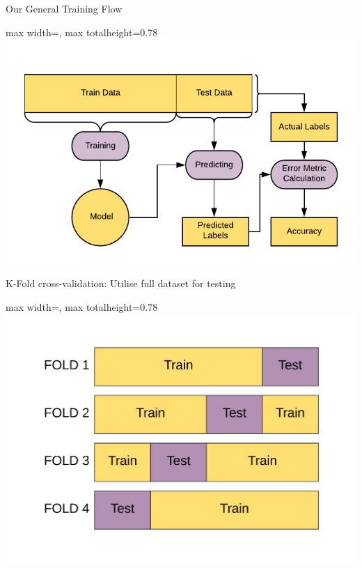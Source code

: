 \documentclass[aspectratio=169,10pt]{beamer}
\newcommand{\fitpic}[1]{\begin{adjustbox}{max width=\linewidth, max totalheight=0.78\textheight}#1\end{adjustbox}}
\begin{document}
	\begin{frame}{Our General Training Flow}
	\fitpic{\includegraphics[width = \textwidth]{../assets/bias-variance/diagrams/general-workflow}}
	\end{frame}

	\begin{frame}{K-Fold cross-validation: Utilise full dataset for testing}
	\fitpic{\includegraphics[width = \textwidth]{../assets/bias-variance/diagrams/cross-validation-train-test.pdf}}
	\end{frame}
\end{document}
